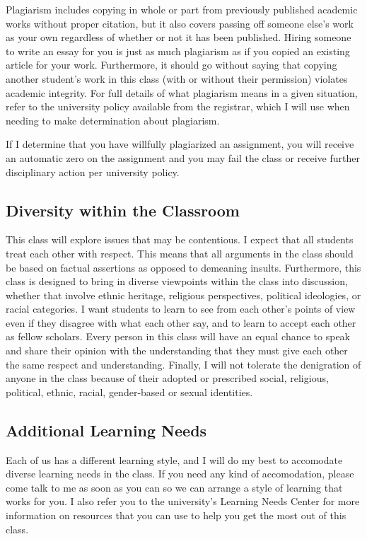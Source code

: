 \documentclass[11pt,]{article}
\begin{document}
Plagiarism includes copying in whole or part from previously published
academic works without proper citation, but it also covers passing off
someone else's work as your own regardless of whether or not it has been
published. Hiring someone to write an essay for you is just as much
plagiarism as if you copied an existing article for your work.
Furthermore, it should go without saying that copying another student's
work in this class (with or without their permission) violates academic
integrity. For full details of what plagiarism means in a given
situation, refer to the university policy available from the registrar,
which I will use when needing to make determination about plagiarism.

If I determine that you have willfully plagiarized an assignment, you
will receive an automatic zero on the assignment and you may fail the
class or receive further disciplinary action per university policy.

\subsection{Diversity within the
Classroom}\label{diversity-within-the-classroom}

This class will explore issues that may be contentious. I expect that
all students treat each other with respect. This means that all
arguments in the class should be based on factual assertions as opposed
to demeaning insults. Furthermore, this class is designed to bring in
diverse viewpoints within the class into discussion, whether that
involve ethnic heritage, religious perspectives, political ideologies,
or racial categories. I want students to learn to see from each other's
points of view even if they disagree with what each other say, and to
learn to accept each other as fellow scholars. Every person in this
class will have an equal chance to speak and share their opinion with
the understanding that they must give each other the same respect and
understanding. Finally, I will not tolerate the denigration of anyone in
the class because of their adopted or prescribed social, religious,
political, ethnic, racial, gender-based or sexual identities.

\subsection{Additional Learning Needs}\label{additional-learning-needs}

Each of us has a different learning style, and I will do my best to
accomodate diverse learning needs in the class. If you need any kind of
accomodation, please come talk to me as soon as you can so we can
arrange a style of learning that works for you. I also refer you to the
university's Learning Needs Center for more information on resources
that you can use to help you get the most out of this class.
\end{document}
